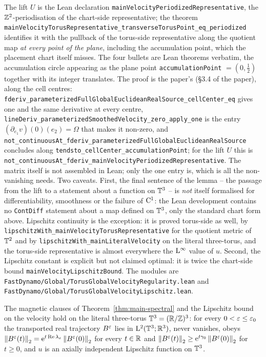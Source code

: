 The lift $U$ is the Lean declaration
\texttt{mainVelocityPeriodizedRepresentative}, the $\mathbb{Z}^2$-periodisation of the
chart-side representative; the theorem
\texttt{mainVelocityTorusRepresentative\_transverseTorusPoint\_eq\_periodized}
identifies it with the pullback of the torus-side representative along the
quotient map \emph{at every point of the plane}, including the accumulation
point, which the placement chart itself misses.  The four bullets are Lean
theorems verbatim, the accumulation circle appearing as the plane point
\texttt{accumulationPoint} $=(0,\tfrac12)$ together with its integer
translates.  The proof is the paper's (§3.4 of the paper), along the cell centres:
\texttt{fderiv\_\allowbreak parameterizedFullGlobalEuclideanRealSource\_\allowbreak cellCenter\_\allowbreak eq} gives one and the
same derivative at every centre,
\texttt{lineDeriv\_parameterizedSmoothedVelocity\_zero\_apply\_one} is the entry
$(\partial_{e_1}v)(0)(e_2)=\Omega$ that makes it non-zero, and
\texttt{not\_\allowbreak continuousAt\_\allowbreak fderiv\_\allowbreak parameterizedFullGlobalEuclideanRealSource} concludes along
\texttt{tendsto\_cellCenter\_accumulationPoint}; for the lift $U$ this is
\texttt{not\_\allowbreak continuousAt\_\allowbreak fderiv\_\allowbreak mainVelocityPeriodizedRepresentative}.  The matrix itself is not assembled in
Lean; only the one entry is, which is all the non-vanishing needs.  Two caveats.  First, the final sentence of the lemma -- the
passage from the lift to a statement about a function on $\mathbb{T}^3$ -- is
\emph{not} itself formalised for differentiability, smoothness or the failure
of $\mathrm{C}^1$: the Lean development contains no \texttt{ContDiff} statement about a
map defined on $\mathbb{T}^3$, only the standard chart form above.  Lipschitz
continuity is the exception: it is proved torus-side as well, by
\texttt{lipschitzWith\_mainVelocityTorusRepresentative} for the quotient metric
of $\mathbb{T}^2$ and by \texttt{lipschitzWith\_mainLiteralVelocity} on the literal
three-torus, and the torus-side representative is almost everywhere the
$\mathrm{L}^\infty$ value of $u$.  Second, the Lipschitz constant is explicit but not
claimed optimal: it is twice the chart-side bound
\texttt{mainVelocityLipschitzBound}.  The modules are
\texttt{FastDynamo/Global/TorusGlobalVelocityRegularity.lean} and
\texttt{FastDynamo/Global/TorusGlobalVelocityLipschitz.lean}.

\begin{lemma}
  \label{lem:main:literal-torus}
  \leanok
  The magnetic clauses of Theorem~\ref{thm:main-spectral} and the Lipschitz
  bound on the velocity hold on the literal three-torus
  $\mathbb{T}^3=(\mathbb{R}/\mathbb{Z})^3$: for every $0<\varepsilon\leq\varepsilon_0$ the transported real
  trajectory $B^\varepsilon$ lies in $\mathrm{L}^2(\mathbb{T}^3;\mathbb{R}^3)$, never vanishes, obeys
  $\left\|B^\varepsilon(t)\right\|_2=\mathrm{e}^{t\operatorname{Re}\lambda_\varepsilon}\left\|B^\varepsilon(0)\right\|_2$ for every
  $t\in\mathbb{R}$ and $\left\|B^\varepsilon(t)\right\|_2\geq\mathrm{e}^{t\gamma_0}\left\|B^\varepsilon(0)\right\|_2$ for
  $t\geq0$, and $u$ is an axially independent Lipschitz function on $\mathbb{T}^3$.
\end{lemma}

